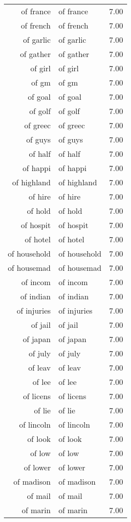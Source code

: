 \begin{table}[ht]
\begin{tabular}{rlr}
  of france & of france & 7.00 \\ 
  of french & of french & 7.00 \\ 
  of garlic & of garlic & 7.00 \\ 
  of gather & of gather & 7.00 \\ 
  of girl & of girl & 7.00 \\ 
  of gm & of gm & 7.00 \\ 
  of goal & of goal & 7.00 \\ 
  of golf & of golf & 7.00 \\ 
  of greec & of greec & 7.00 \\ 
  of guys & of guys & 7.00 \\ 
  of half & of half & 7.00 \\ 
  of happi & of happi & 7.00 \\ 
  of highland & of highland & 7.00 \\ 
  of hire & of hire & 7.00 \\ 
  of hold & of hold & 7.00 \\ 
  of hospit & of hospit & 7.00 \\ 
  of hotel & of hotel & 7.00 \\ 
  of household & of household & 7.00 \\ 
  of housemad & of housemad & 7.00 \\ 
  of incom & of incom & 7.00 \\ 
  of indian & of indian & 7.00 \\ 
  of injuries & of injuries & 7.00 \\ 
  of jail & of jail & 7.00 \\ 
  of japan & of japan & 7.00 \\ 
  of july & of july & 7.00 \\ 
  of leav & of leav & 7.00 \\ 
  of lee & of lee & 7.00 \\ 
  of licens & of licens & 7.00 \\ 
  of lie & of lie & 7.00 \\ 
  of lincoln & of lincoln & 7.00 \\ 
  of look & of look & 7.00 \\ 
  of low & of low & 7.00 \\ 
  of lower & of lower & 7.00 \\ 
  of madison & of madison & 7.00 \\ 
  of mail & of mail & 7.00 \\ 
  of marin & of marin & 7.00 \\ 

\end{tabular}
\end{table}
